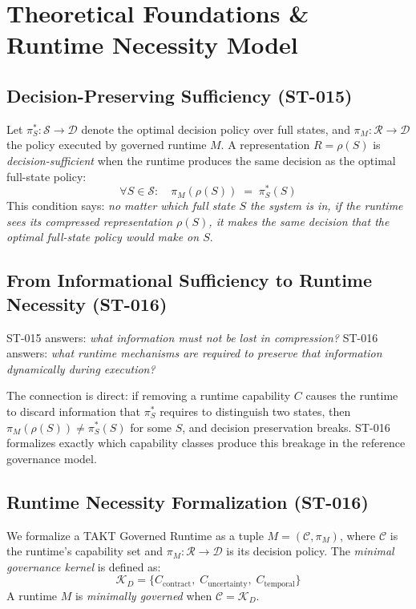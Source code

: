 \section{Theoretical Foundations \& Runtime Necessity Model}

\subsection{Decision-Preserving Sufficiency (ST-015)}
Let $\pi^*_S : \mathcal{S} \to \mathcal{D}$ denote the optimal decision policy
over full states, and $\pi_M : \mathcal{R} \to \mathcal{D}$ the policy executed
by governed runtime $M$. A representation $R = \rho(S)$ is
\emph{decision-sufficient} when the runtime produces the same decision as the
optimal full-state policy:
\[
\forall S \in \mathcal{S}:\quad \pi_M(\rho(S)) \;=\; \pi^*_S(S)
\]
This condition says: \emph{no matter which full state $S$ the system is in, if
the runtime sees its compressed representation $\rho(S)$, it makes the same
decision that the optimal full-state policy would make on $S$}.

\subsection{From Informational Sufficiency to Runtime Necessity (ST-016)}
ST-015 answers: \emph{what information must not be lost in compression?}
ST-016 answers: \emph{what runtime mechanisms are required to preserve that
information dynamically during execution?}

The connection is direct: if removing a runtime capability $C$ causes the runtime
to discard information that $\pi^*_S$ requires to distinguish two states, then
$\pi_M(\rho(S)) \neq \pi^*_S(S)$ for some $S$, and decision preservation breaks.
ST-016 formalizes exactly which capability classes produce this breakage in the
reference governance model.

\subsection{Runtime Necessity Formalization (ST-016)}
We formalize a TAKT Governed Runtime as a tuple $M = (\mathcal{C}, \pi_M)$, where
$\mathcal{C}$ is the runtime's capability set and $\pi_M : \mathcal{R} \to \mathcal{D}$
is its decision policy. The \emph{minimal governance kernel} is defined as:
\[
\mathcal{K}_D = \{C_{\text{contract}},\; C_{\text{uncertainty}},\; C_{\text{temporal}}\}
\]
A runtime $M$ is \emph{minimally governed} when $\mathcal{C} = \mathcal{K}_D$.

